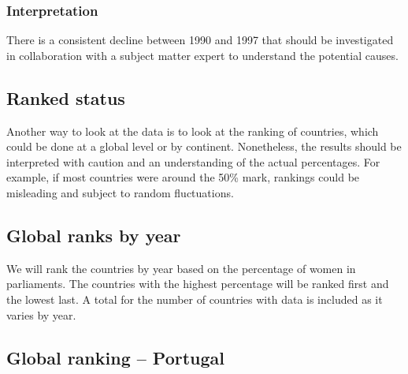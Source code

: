 \documentclass[a4paper,9pt,twocolumn,twoside,]{pinp}
\begin{document}
\hypertarget{interpretation-2}{%
\subsubsection{Interpretation}\label{interpretation-2}}

There is a consistent decline between 1990 and 1997 that should be
investigated in collaboration with a subject matter expert to understand
the potential causes.

\hypertarget{ranked-status}{%
\subsection{Ranked status}\label{ranked-status}}

Another way to look at the data is to look at the ranking of countries,
which could be done at a global level or by continent. Nonetheless, the
results should be interpreted with caution and an understanding of the
actual percentages. For example, if most countries were around the 50\%
mark, rankings could be misleading and subject to random fluctuations.

\hypertarget{global-ranks-by-year}{%
\subsection{Global ranks by year}\label{global-ranks-by-year}}

We will rank the countries by year based on the percentage of women in
parliaments. The countries with the highest percentage will be ranked
first and the lowest last. A total for the number of countries with data
is included as it varies by year.

\begin{Shaded}
\end{Shaded}

\hypertarget{global-ranking-portugal}{%
\subsection{Global ranking -- Portugal}\label{global-ranking-portugal}}
\end{document}
